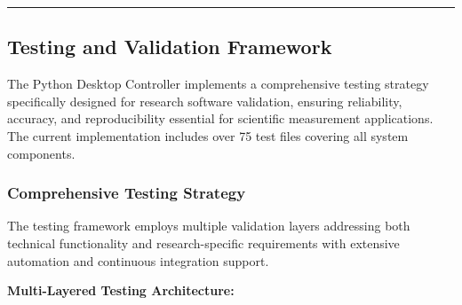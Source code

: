 \documentclass[12pt,a4paper]{article}
\begin{document}
\hrule

\subsection{Testing and Validation Framework}

The Python Desktop Controller implements a comprehensive testing strategy specifically designed for research software
validation, ensuring reliability, accuracy, and reproducibility essential for scientific measurement applications. The
current implementation includes over 75 test files covering all system components.

\subsubsection{Comprehensive Testing Strategy}

The testing framework employs multiple validation layers addressing both technical functionality and research-specific
requirements with extensive automation and continuous integration support.

\textbf{Multi-Layered Testing Architecture:}
\end{document}
